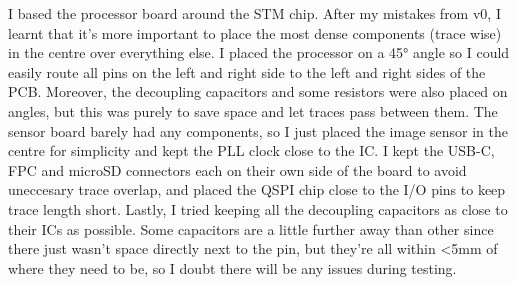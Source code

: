 I based the processor board around the STM chip. After my mistakes from v0, I learnt that it's more important to place the most dense components (trace wise) in the centre over everything else. I placed the processor on a 45° angle so I could easily route all pins on the left and right side to the left and right sides of the PCB. Moreover, the decoupling capacitors and some resistors were also placed on angles, but this was purely to save space and let traces pass between them. The sensor board barely had any components, so I just placed the image sensor in the centre for simplicity and kept the PLL clock close to the IC.
\nl
I kept the USB-C, FPC and microSD connectors each on their own side of the board to avoid uneccesary trace overlap, and placed the QSPI chip close to the I/O pins to keep trace length short.
\nl
Lastly, I tried keeping all the decoupling capacitors as close to their ICs as possible. Some capacitors are a little further away than other since there just wasn't space directly next to the pin, but they're all within <5mm of where they need to be, so I doubt there will be any issues during testing.
